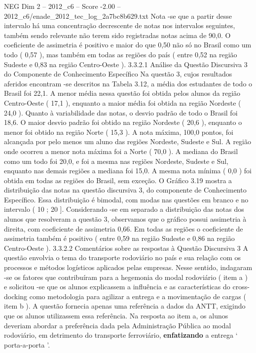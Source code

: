 \begin{textsample}{NEG Dim 2 – 2012\_c6 – Score -2.00 – 2012\_c6/enade\_2012\_tec\_log\_2a7bc8b629.txt}
Nota -se que a partir desse intervalo há uma concentração decrescente de notas nos intervalos seguintes, também sendo relevante não terem sido registradas notas acima de 90,0.
O coeficiente de assimetria é positivo e maior do que 0,50 não só no Brasil como um todo ( 0,57 ), mas também em todas as regiões do país ( entre 0,52 na região Sudeste e 0,83 na região Centro-Oeste ). 3.3.2.1 Análise da Questão Discursiva 3 do Componente de Conhecimento Específico Na questão 3, cujos resultados aferidos encontram -se descritos na Tabela 3.12, a média dos estudantes de todo o Brasil foi 22,1.
A menor média nessa questão foi obtida pelos alunos da região Centro-Oeste ( 17,1 ), enquanto a maior média foi obtida na região Nordeste ( 24,0 ).
Quanto à variabilidade das notas, o desvio padrão de todo o Brasil foi 18,6.
O maior desvio padrão foi obtido na região Nordeste ( 20,6 ), enquanto o menor foi obtido na região Norte ( 15,3 ).
A nota máxima, 100,0 pontos, foi alcançada por pelo menos um aluno das regiões Nordeste, Sudeste e Sul.
A região onde ocorreu a menor nota máxima foi a Norte ( 70,0 ).
A mediana do Brasil como um todo foi 20,0, e foi a mesma nas regiões Nordeste, Sudeste e Sul, enquanto nas demais regiões a mediana foi 15,0.
A mesma nota mínima ( 0,0 ) foi obtida em todas as regiões do Brasil, sem exceção.
O Gráfico 3.19 mostra a distribuição das notas na questão discursiva 3, do componente de Conhecimento Específico.
Essa distribuição é bimodal, com modas nas questões em branco e no intervalo ( 10 ; 20 ].
Considerando -se em separado a distribuição das notas dos alunos que resolveram a questão 3, observamos que o gráfico possui assimetria à direita, com coeficiente de assimetria 0,66.
Em todas as regiões o coeficiente de assimetria também é positivo ( entre 0,59 na região Sudeste e 0,86 na região Centro-Oeste ). 3.3.2.2 Comentários sobre as respostas à Questão Discursiva 3 A questão envolvia o tema do transporte rodoviário no país e sua relação com os processos e métodos logísticos aplicados pelas empresas.
Nesse sentido, indagaram -se os fatores que contribuíram para a hegemonia do modal rodoviário ( item a ) e solicitou -se que os alunos explicassem a influência e as características do cross-docking como metodologia para agilizar a entrega e a movimentação de cargas ( item b ).
A questão fornecia apenas uma referência a dados da ANTT, exigindo que os alunos utilizassem essa referência.
Na resposta ao item a, os alunos deveriam abordar a preferência dada pela Administração Pública ao modal rodoviário, em detrimento do transporte ferroviário, \textbf{enfatizando} a entrega ‘ porta-a-porta ’.

\end{textsample}
